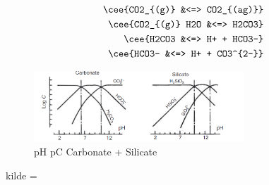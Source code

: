 \begin{align}
    \cee{CO2_{(g)} &<=> CO2_{(ag)}} \\
    \cee{CO2_{(g)} H2O &<=> H2CO3}\\ 
    \cee{H2CO3 &<=> H+ + HCO3-} \\
    \cee{HCO3- &<=> H+ + CO3^{2-}}
\end{align}






\begin{figure}[H]
    \centering
    \includegraphics[width=0.7\textwidth]{Billeder/teori/carbonate_silicate.png}
    \caption{pH pC Carbonate + Silicate}
    \label{fig:pH_pC}
\end{figure}

kilde = \citep{WaterChemistry1980}
